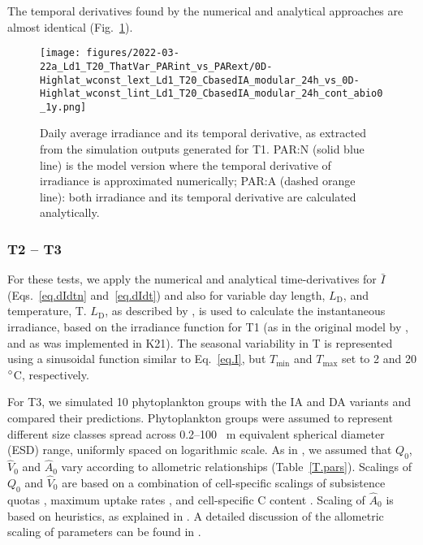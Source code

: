 \documentclass[gmd, manuscript]{copernicus}
\begin{document}
    The temporal derivatives found by the numerical and analytical approaches are almost identical (Fig.~\ref{f.T1light}).
    \begin{figure}[ht!]
    \texttt{[image: figures/2022-03-22a\_Ld1\_T20\_ThatVar\_PARint\_vs\_PARext/0D-Highlat\_wconst\_lext\_Ld1\_T20\_CbasedIA\_modular\_24h\_vs\_0D-Highlat\_wconst\_lint\_Ld1\_T20\_CbasedIA\_modular\_24h\_cont\_abio0\_1y.png]}
    \caption{Daily average irradiance and its temporal derivative, as extracted from the simulation outputs generated for T1. PAR:N (solid blue line) is the model version where the temporal derivative of irradiance is approximated numerically; PAR:A (dashed orange line): both irradiance and its temporal derivative are calculated analytically.\label{f.T1light}}
    \end{figure}

    \subsubsection{T2 -- T3}

    For these tests, we apply the numerical and analytical time-derivatives for $\bar{I}$ (Eqs.~\ref{eq.dIdtn} and~\ref{eq.dIdt}) and also for variable day length, $L_{\text{D}}$, and temperature, T\@. $L_{\text{D}}$, as described by \citet{Forsythe2003}, is used to calculate the instantaneous irradiance, based on the irradiance function for T1 (as in the original model by \citet{Pahlowetal13}, and as was implemented in K21).  The seasonal variability in T is represented using a sinusoidal function similar to Eq.~\ref{eq.I}, but $T_{\min}$ and $T_{\max}$ set to 2 and 20$^{\circ}$C, respectively.

    For T3, we simulated 10 phytoplankton groups with the IA and DA variants and compared their predictions. Phytoplankton groups were assumed to represent different size classes spread across 0.2--100 \unit{{\mu}m} equivalent spherical diameter (ESD) range, uniformly spaced on logarithmic scale. As in \citet{Smith2016}, we assumed that $Q_0$, $\hat{V}_0$ and $\hat{A}_0$ vary according to allometric relationships  (Table~\ref{T.pars}). Scalings of $Q_0$ and $\hat{V}_0$ are based on a combination of cell-specific scalings of subsistence quotas \citep[][`marine species']{Edwards2012}, maximum uptake rates \citep{Maranon2013}, and cell-specific C content \citep[][`protist plankton excluding diatoms']{Menden2000}. Scaling of $\hat{A}_0$ is based on heuristics, as explained in \citet{Smith2014a}. A detailed discussion of the allometric scaling of parameters can be found in \citet{Smith2016}.
\end{document}
